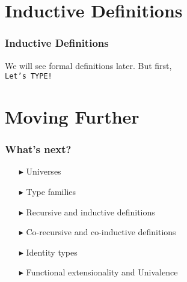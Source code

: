 \documentclass[14pt,compress]{beamer}
\begin{document}
\section{Inductive Definitions}
\begin{frame}\label{frame : Inductive definitions}
\frametitle{Inductive Definitions}
\pause
We will see formal definitions later. But first,
\pause
\\
\textcolor{beamer@mathtext}{
\texttt{Let's TYPE!}}
\end{frame}
\section{Moving Further}
\begin{frame}\label{frame : what's next}
\pause
\frametitle{What's next?}
\begin{enumerate}
\item[$\blacktriangleright$] Universes
\item[$\blacktriangleright$] Type families
\item[$\blacktriangleright$] Recursive and inductive definitions
\item[$\blacktriangleright$] Co-recursive and co-inductive definitions
\item[$\blacktriangleright$] Identity types
\item[$\blacktriangleright$] Functional extensionality and Univalence
\end{enumerate}
\end{frame}
\end{document}
